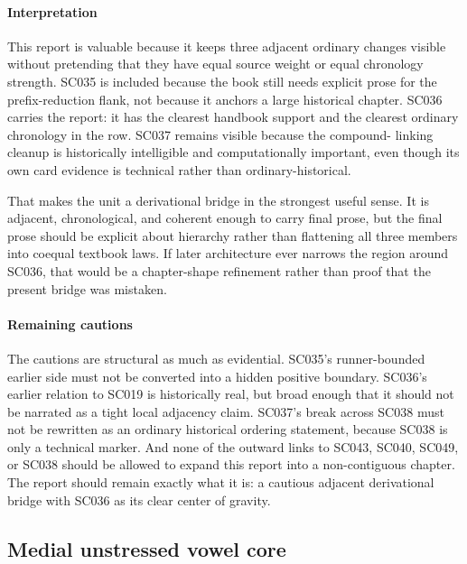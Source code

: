 \documentclass[
  british,
  a4paper,
]{article}
\newcounter{none} %
\begin{document}
\paragraph{Interpretation}\label{interpretation-23}

This report is valuable because it keeps three adjacent ordinary changes
visible without pretending that they have equal source weight or equal
chronology strength. SC035 is included because the book still needs
explicit prose for the prefix-reduction flank, not because it anchors a
large historical chapter. SC036 carries the report: it has the clearest
handbook support and the clearest ordinary chronology in the row. SC037
remains visible because the compound- linking cleanup is historically
intelligible and computationally important, even though its own card
evidence is technical rather than ordinary-historical.

That makes the unit a derivational bridge in the strongest useful sense.
It is adjacent, chronological, and coherent enough to carry final prose,
but the final prose should be explicit about hierarchy rather than
flattening all three members into coequal textbook laws. If later
architecture ever narrows the region around SC036, that would be a
chapter-shape refinement rather than proof that the present bridge was
mistaken.

\paragraph{Remaining cautions}\label{remaining-cautions-23}

The cautions are structural as much as evidential. SC035's
runner-bounded earlier side must not be converted into a hidden positive
boundary. SC036's earlier relation to SC019 is historically real, but
broad enough that it should not be narrated as a tight local adjacency
claim. SC037's break across SC038 must not be rewritten as an ordinary
historical ordering statement, because SC038 is only a technical marker.
And none of the outward links to SC043, SC040, SC049, or SC038 should be
allowed to expand this report into a non-contiguous chapter. The report
should remain exactly what it is: a cautious adjacent derivational
bridge with SC036 as its clear center of gravity.

\subsection{Medial unstressed vowel
core}\label{medial-unstressed-vowel-core}
\end{document}
